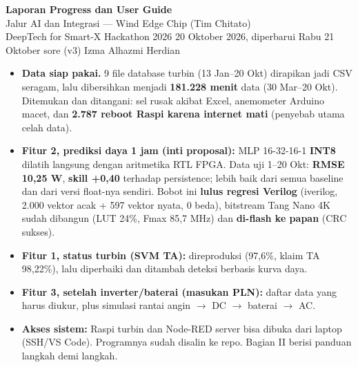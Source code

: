 \documentclass[10.5pt,a4paper]{article}
\begin{document}
\sloppy\setlength{\emergencystretch}{3em}

\begin{center}
{\LARGE\bfseries Laporan Progress dan User Guide}\\[3pt]
{\large Jalur AI dan Integrasi --- Wind Edge Chip (Tim Chitato)}\\[2pt]
{\normalsize DeepTech for Smart-X Hackathon 2026 \textbullet{} 20 Oktober 2026, diperbarui Rabu 21 Oktober sore (v3) \textbullet{} Izma Alhazmi Herdian}
\end{center}

\vspace{4pt}
\begin{ringkas}
\begin{itemize}
  \item \textbf{Data siap pakai.} 9 file database turbin (13 Jan--20 Okt) dirapikan jadi CSV seragam, lalu dibersihkan menjadi
        \textbf{181.228 menit} data (30 Mar--20 Okt). Ditemukan dan ditangani: sel rusak akibat Excel, anemometer Arduino macet,
        dan \textbf{2.787 reboot Raspi karena internet mati} (penyebab utama celah data).
  \item \textbf{Fitur 2, prediksi daya 1 jam (inti proposal):} MLP 16-32-16-1 \textbf{INT8} dilatih langsung dengan aritmetika RTL FPGA.
        Data uji 1--20 Okt: \textbf{RMSE 10,25 W}, \textbf{skill +0,40} terhadap persistence; lebih baik dari semua baseline
        dan dari versi float-nya sendiri. Bobot ini \textbf{lulus regresi Verilog} (iverilog, 2.000 vektor acak + 597 vektor nyata, 0 beda), bitstream Tang Nano 4K sudah dibangun (LUT 24\%, Fmax 85,7 MHz) dan \textbf{di-flash ke papan} (CRC sukses).
  \item \textbf{Fitur 1, status turbin (SVM TA):} direproduksi (97,6\%, klaim TA 98,22\%), lalu diperbaiki dan
        ditambah deteksi berbasis kurva daya.
  \item \textbf{Fitur 3, setelah inverter/baterai (masukan PLN):} daftar data yang harus diukur, plus simulasi rantai
        angin $\to$ DC $\to$ baterai $\to$ AC.
  \item \textbf{Akses sistem:} Raspi turbin dan Node-RED server bisa dibuka dari laptop (SSH/VS Code). Programnya sudah
        disalin ke repo. Bagian II berisi panduan langkah demi langkah.
\end{itemize}
\end{ringkas}
\end{document}
